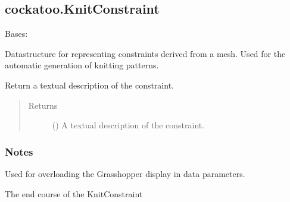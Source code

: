 \documentclass[letterpaper,10pt,english]{sphinxmanual}
\begin{document}
\subsection{cockatoo.KnitConstraint}
\label{\detokenize{cockatoo:cockatoo-knitconstraint}}

\begin{fulllineitems}
\label{\detokenize{cockatoo:cockatoo.KnitConstraint}}
Bases: 

Datastructure for representing constraints derived from a mesh. Used for
the automatic generation of knitting patterns.

\begin{fulllineitems}
\label{\detokenize{cockatoo:cockatoo.KnitConstraint.ToString}}
Return a textual description of the constraint.
\begin{quote}\begin{description}
\item[{Returns}] \leavevmode
{} () \textendash{} A textual description of the constraint.

\end{description}\end{quote}
\subsubsection*{Notes}

Used for overloading the Grasshopper display in data parameters.

\end{fulllineitems}


\begin{fulllineitems}
\label{\detokenize{cockatoo:cockatoo.KnitConstraint.end_course}}
The end course of the KnitConstraint


\end{fulllineitems}
\end{fulllineitems}
\end{document}
